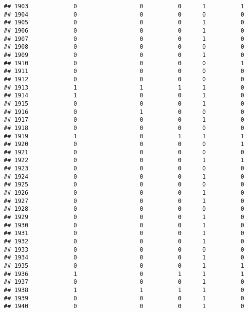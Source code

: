 \documentclass[
]{article}
\begin{document}
\begin{verbatim}
## 1903             0                  0          0      1          1
## 1904             0                  0          0      0          0
## 1905             0                  0          0      1          0
## 1906             0                  0          0      1          0
## 1907             0                  0          0      1          0
## 1908             0                  0          0      0          0
## 1909             0                  0          0      1          0
## 1910             0                  0          0      0          1
## 1911             0                  0          0      0          0
## 1912             0                  0          0      0          0
## 1913             1                  1          1      1          0
## 1914             1                  0          0      1          0
## 1915             0                  0          0      1          0
## 1916             0                  1          0      0          0
## 1917             0                  0          0      1          0
## 1918             0                  0          0      0          0
## 1919             1                  0          1      1          1
## 1920             0                  0          0      0          1
## 1921             0                  0          0      0          0
## 1922             0                  0          0      1          1
## 1923             0                  0          0      0          0
## 1924             0                  0          0      1          0
## 1925             0                  0          0      0          0
## 1926             0                  0          0      1          0
## 1927             0                  0          0      1          0
## 1928             0                  0          0      0          0
## 1929             0                  0          0      1          0
## 1930             0                  0          0      1          0
## 1931             0                  0          0      1          0
## 1932             0                  0          0      1          0
## 1933             0                  0          0      0          0
## 1934             0                  0          0      1          0
## 1935             0                  0          0      1          1
## 1936             1                  0          1      1          1
## 1937             0                  0          0      1          0
## 1938             1                  1          1      1          0
## 1939             0                  0          0      1          0
## 1940             0                  0          0      1          0

\end{verbatim}
\end{document}
